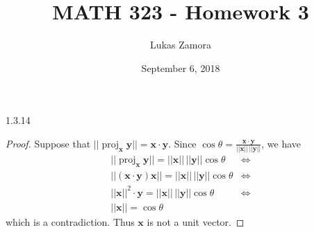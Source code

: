 \documentclass{article}
\title{MATH 323 - Homework 3}
\author{Lukas Zamora}
\date{September 6, 2018}
\theoremstyle{definition}
\renewcommand{\vec}[1]{\boldsymbol{\mathbf{#1}}}
\DeclareMathOperator{\proj}{proj}
\begin{document}
    \maketitle
    
    \begin{prob}{1.3.14} $  $ \\
		\begin{proof}
			Suppose that $ || \proj_{\vec{x}} \vec{y} || = \vec{x} \cdot \vec{y} $. Since $ \cos\theta = \frac{\vec{x} \cdot \vec{y}}{||\vec{x}|| \, ||\vec{y}||} $, we have  
			\begin{align*}
				|| \proj_{\vec{x}} \vec{y} || = ||\vec{x}|| \, ||\vec{y}|| \cos\theta &\Leftrightarrow \\
				|| (\vec{x} \cdot \vec{y}) \vec{x} || = ||\vec{x}|| \, ||\vec{y}|| \cos\theta &\Leftrightarrow \\
				||\vec{x}||^2 \cdot \vec{y} = ||\vec{x}|| \, ||\vec{y}|| \cos\theta &\Leftrightarrow \\
				||\vec{x}|| = \cos\theta
			\end{align*}
			which is a contradiction. Thus $ \vec{x} $ is not a unit vector.
		\end{proof}    	
    \end{prob}
\end{document}
